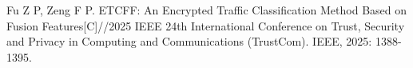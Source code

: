
\begin{achievements}
  \begin{theachievements}[已发表论文]
    \item Fu Z P, Zeng F P. ETCFF: An Encrypted Traffic Classification Method Based on Fusion Features[C]//2025 IEEE 24th International Conference on Trust, Security and Privacy in Computing and Communications (TrustCom). IEEE, 2025: 1388-1395.
  \end{theachievements}
\end{achievements}
